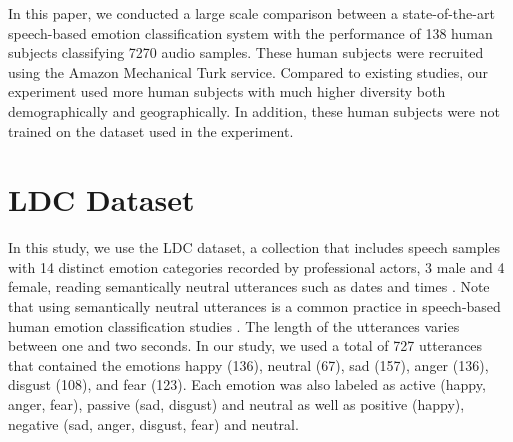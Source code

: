 \documentclass{article}
\begin{document}
In this paper, we conducted a large scale comparison between a
state-of-the-art speech-based emotion classification system with the
performance of 138 human subjects classifying 7270 audio samples. These human subjects were recruited using the Amazon Mechanical Turk service. Compared to existing studies, our experiment used more human subjects
with much higher diversity both demographically and geographically.
In addition, these human subjects were not trained on the
dataset used in the experiment. 
\section{LDC Dataset} \label{LDC Dataset}
In this study, we use the LDC dataset, a collection that includes speech samples with 14 distinct emotion categories recorded by professional actors, 3 male and 4 female, reading semantically neutral utterances such as dates and times \cite{LDC}. Note that using semantically neutral utterances is a common practice in speech-based human emotion classification studies \cite{esparza2012automatic, shaukat2010emotional,toth2008speech}. The length of the utterances varies between one and two seconds. In our study, we used a total of 727 utterances that contained the emotions happy (136), neutral (67), sad (157), anger (136), disgust (108), and fear (123).  Each emotion was also labeled as active (happy, anger, fear), passive (sad, disgust) and neutral as well as positive (happy), negative (sad, anger, disgust, fear) and neutral.	
\end{document}
